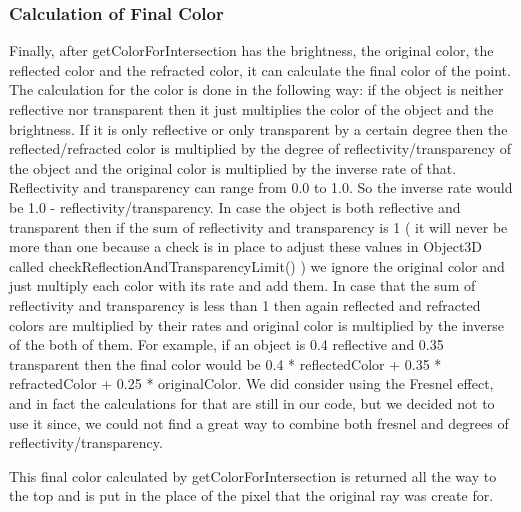 \documentclass[10pt]{scrartcl}
\begin{document}
\par

\subsubsection{ Calculation of Final Color }
Finally, after getColorForIntersection has the brightness, the original color, the reflected color and the refracted color, it can calculate the final color of the point. The calculation for the color is done in the following way: if the object is neither reflective nor transparent then it just multiplies the color of the object and the brightness. If it is only reflective or only transparent by a certain degree then the reflected/refracted color is multiplied by the degree of reflectivity/transparency of the object and the original color is multiplied by the inverse rate of that. Reflectivity and transparency can range from 0.0 to 1.0. So the inverse rate would be 1.0 - reflectivity/transparency.
In case the object is both reflective and transparent then if the sum of reflectivity and transparency is 1 ( it will never be more than one because a check is in place to adjust these values in Object3D called checkReflectionAndTransparencyLimit() ) we ignore the original color and just multiply each color with its rate and add them. In case that the sum of reflectivity and transparency is less than 1 then again reflected and refracted colors are multiplied by their rates and original color is multiplied by the inverse of the both of them. For example, if an object is 0.4 reflective and 0.35 transparent then the final color would be 0.4 * reflectedColor + 0.35 * refractedColor + 0.25 * originalColor. We did consider using the Fresnel effect, and in fact the calculations for that are still in our code, but we decided not to use it since, we could not find a great way to combine both fresnel and degrees of reflectivity/transparency.

\par

This final color calculated by getColorForIntersection is returned all the way to the top and is put in the place of the pixel that the original ray was create for.
\end{document}
